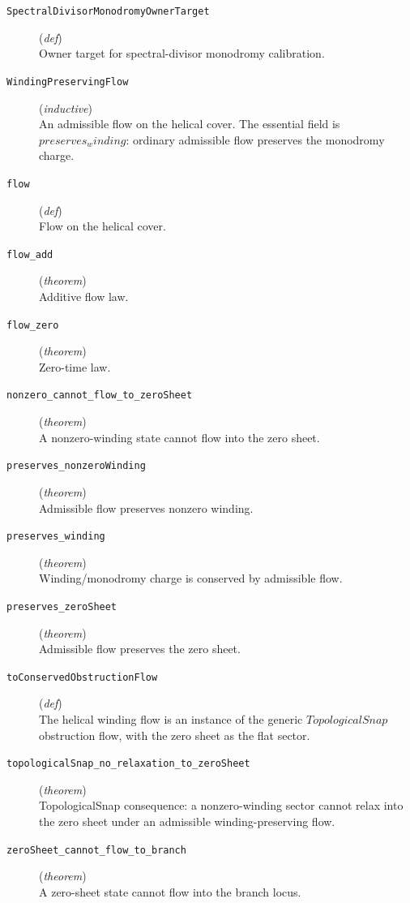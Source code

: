 \documentclass[11pt,a4paper]{article}
\begin{document}
\begin{description}
  \item[\texttt{SpectralDivisorMonodromyOwnerTarget}] (\textit{def}) \\ Owner target for spectral-divisor monodromy calibration.
  \item[\texttt{WindingPreservingFlow}] (\textit{inductive}) \\ An admissible flow on the helical cover. 
The essential field is $preserves_winding$: ordinary admissible flow preserves 
the monodromy charge.
  \item[\texttt{flow}] (\textit{def}) \\ Flow on the helical cover.
  \item[\texttt{flow\_add}] (\textit{theorem}) \\ Additive flow law.
  \item[\texttt{flow\_zero}] (\textit{theorem}) \\ Zero-time law.
  \item[\texttt{nonzero\_cannot\_flow\_to\_zeroSheet}] (\textit{theorem}) \\ A nonzero-winding state cannot flow into the zero sheet.
  \item[\texttt{preserves\_nonzeroWinding}] (\textit{theorem}) \\ Admissible flow preserves nonzero winding.
  \item[\texttt{preserves\_winding}] (\textit{theorem}) \\ Winding/monodromy charge is conserved by admissible flow.
  \item[\texttt{preserves\_zeroSheet}] (\textit{theorem}) \\ Admissible flow preserves the zero sheet.
  \item[\texttt{toConservedObstructionFlow}] (\textit{def}) \\ The helical winding flow is an instance of the generic $TopologicalSnap$ 
obstruction flow, with the zero sheet as the flat sector.
  \item[\texttt{topologicalSnap\_no\_relaxation\_to\_zeroSheet}] (\textit{theorem}) \\ TopologicalSnap consequence: a nonzero-winding sector cannot relax into the 
zero sheet under an admissible winding-preserving flow.
  \item[\texttt{zeroSheet\_cannot\_flow\_to\_branch}] (\textit{theorem}) \\ A zero-sheet state cannot flow into the branch locus.
\end{description}
\end{document}
